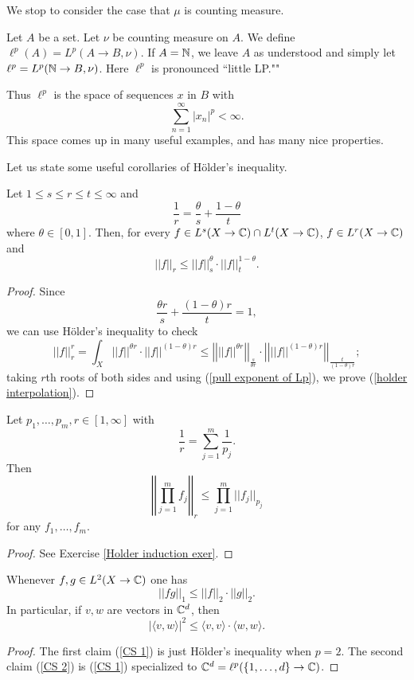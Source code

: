 We stop to consider the case that $\mu$ is counting measure.

\begin{definition}
Let $A$ be a set. Let $\nu$ be counting measure on $A$. We define $\ell^p(A) = L^p(A \to B, \nu)$.
If $A = \mathbb{N}$, we leave $A$ as understood and simply let $\ell^p = L^p(\mathbb{N} \to B, \nu)$.
Here $\ell^p$ is pronounced ``little LP.""
\end{definition}

Thus $\ell^p$ is the space of sequences $x$ in $B$ with
$$\sum_{n = 1}^\infty |x_n|^p < \infty.$$
This space comes up in many useful examples, and has many nice properties.

Let us state some useful corollaries of H\"older's inequality.
\begin{corollary}
Let $1 \leq s \leq r \leq t \leq \infty$ and
$$\frac{1}{r} = \frac{\theta}{s} + \frac{1 - \theta}{t}$$
where $\theta \in [0, 1]$. Then, for every $f \in L^s(X \to \mathbb{C}) \cap L^t(X \to \mathbb{C})$, $f \in L^r(X \to \mathbb{C})$ and
\begin{equation}
\label{holder interpolation}
||f||_r \leq ||f||_s^\theta \cdot ||f||_t^{1-\theta}.
\end{equation}
\end{corollary}
\begin{proof}
Since
$$\frac{\theta r}{s} + \frac{(1 - \theta)r}{t} = 1,$$
we can use H\"older's inequality to check
$$||f||_r^r = \int_X ||f||^{\theta r} \cdot ||f||^{(1 - \theta)r} \leq \left|\left|||f||^{\theta r}\right|\right|_{\frac{s}{\theta r}} \cdot \left|\left|||f||^{(1 - \theta) r}\right|\right|_{\frac{t}{(1 - \theta)r}};$$
taking $r$th roots of both sides and using (\ref{pull exponent of Lp}), we prove (\ref{holder interpolation}).
\end{proof}

\begin{corollary}
\label{Holder induction}
Let $p_1, \dots, p_m, r \in [1, \infty]$ with
$$\frac{1}{r} = \sum_{j=1}^m \frac{1}{p_j}.$$
Then
$$\left|\left|\prod_{j=1}^m f_j\right|\right|_r \leq \prod_{j=1}^m ||f_j||_{p_j}$$
for any $f_1, \dots, f_m$.
\end{corollary}
\begin{proof}
See Exercise \ref{Holder induction exer}.
\end{proof}

\begin{corollary}
Whenever $f, g \in L^2(X \to \mathbb{C})$ one has
\begin{equation}
\label{CS 1}
||fg||_1 \leq ||f||_2 \cdot ||g||_2.
\end{equation}
In particular, if $v, w$ are vectors in $\mathbb{C}^d$, then
\begin{equation}
\label{CS 2}
|\langle v, w\rangle|^2 \leq \langle v, v\rangle \cdot \langle w, w\rangle.
\end{equation}
\end{corollary}
\begin{proof}
The first claim (\ref{CS 1}) is just H\"older's inequality when $p = 2$.
The second claim (\ref{CS 2}) is (\ref{CS 1}) specialized to $\mathbb{C}^d = \ell^p(\{1, \dots, d\} \to \mathbb{C})$.
\end{proof}

